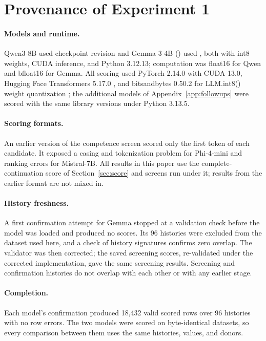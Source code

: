 \section{Provenance of Experiment 1}
\label{app:provenance}

\paragraph{Models and runtime.} Qwen3-8B used checkpoint revision  and Gemma 3 4B () used , both with int8 weights, CUDA inference, and Python 3.12.13; computation was float16 for Qwen and bfloat16 for Gemma. All scoring used PyTorch 2.14.0 \citep{paszke2019pytorch} with CUDA 13.0, Hugging Face Transformers 5.17.0 \citep{wolf2020transformers}, and bitsandbytes 0.50.2 for LLM.int8() weight quantization \citep{dettmers2022llmint8}; the additional models of Appendix~\ref{app:followups} were scored with the same library versions under Python 3.13.5.

\paragraph{Scoring formats.} An earlier version of the competence screen scored only the first token of each candidate. It exposed a casing and tokenization problem for Phi-4-mini and ranking errors for Mistral-7B. All results in this paper use the complete-continuation score of Section~\ref{sec:score} and screens run under it; results from the earlier format are not mixed in.

\paragraph{History freshness.} A first confirmation attempt for Gemma stopped at a validation check before the model was loaded and produced no scores. Its 96 histories were excluded from the dataset used here, and a check of history signatures confirms zero overlap. The validator was then corrected; the saved screening scores, re-validated under the corrected implementation, gave the same screening results. Screening and confirmation histories do not overlap with each other or with any earlier stage.

\paragraph{Completion.} Each model's confirmation produced 18,432 valid scored rows over 96 histories with no row errors. The two models were scored on byte-identical datasets, so every comparison between them uses the same histories, values, and donors.

